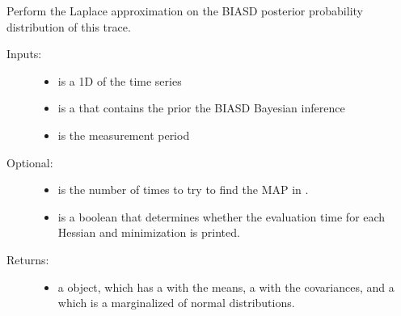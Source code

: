 \documentclass[letterpaper,10pt,english]{sphinxmanual}
\begin{document}

\begin{fulllineitems}
\label{code_laplace:laplace.laplace_approximation}
Perform the Laplace approximation on the BIASD posterior probability distribution of this trace.
\begin{description}
\item[{Inputs:}] \leavevmode\begin{itemize}
\item {} 
 is a 1D  of the time series

\item {} 
 is a  that contains the prior the BIASD Bayesian inference

\item {} 
 is the measurement period

\end{itemize}

\item[{Optional:}] \leavevmode\begin{itemize}
\item {} 
 is the number of times to try to find the MAP in .

\item {} 
 is a boolean that determines whether the evaluation time for each Hessian and minimization is printed.

\end{itemize}

\item[{Returns:}] \leavevmode\begin{itemize}
\item {} 
a  object, which has a  with the means, a  with the covariances, and a  which is a marginalized  of normal distributions.

\end{itemize}

\end{description}

\end{fulllineitems}
\end{document}
